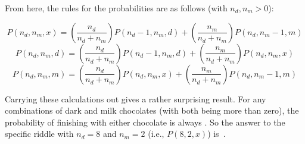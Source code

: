 \documentclass{article}
\begin{document}
From here, the rules for the probabilities are as follows (with $n_{d},n_{m}>0$):

\[
P(n_{d},n_{m},x)=\left(\frac{n_{d}}{n_{d}+n_{m}}\right)P(n_{d}-1,n_{m},d)+\left(\frac{n_{m}}{n_{d}+n_{m}}\right)P(n_{d},n_{m}-1,m)
\]
\[
P(n_{d},n_{m},d)=\left(\frac{n_{d}}{n_{d}+n_{m}}\right)P(n_{d}-1,n_{m},d)+\left(\frac{n_{m}}{n_{d}+n_{m}}\right)P(n_{d},n_{m},x)
\]
\[
P(n_{d},n_{m},m)=\left(\frac{n_{d}}{n_{d}+n_{m}}\right)P(n_{d},n_{m},x)+\left(\frac{n_{m}}{n_{d}+n_{m}}\right)P(n_{d},n_{m}-1,m)
\]

Carrying these calculations out gives a rather surprising result.
For any combinations of dark and milk chocolates (with both being more than zero), the probability of finishing with either chocolate is always .
So the answer to the specific riddle with $n_{d}=8$ and $n_{m}=2$ (i.e., $P(8,2,x)$) is
\,.
\end{document}
